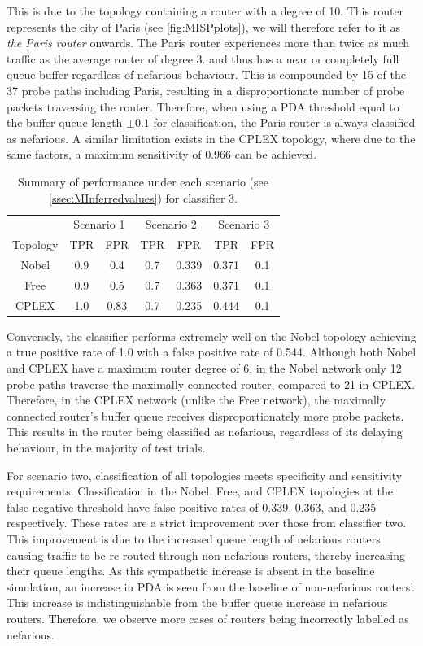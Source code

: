This is due to the topology containing a router with a degree of 10. This router represents the city of Paris (see \cref{fig:MISPplots}), we will therefore refer to it as \textit{the Paris router} onwards. The Paris router experiences more than twice as much traffic as the average router of degree 3. and thus has a near or completely full queue buffer regardless of nefarious behaviour. This is compounded by 15 of the 37 probe paths including Paris, resulting in a disproportionate number of probe packets traversing the router. Therefore, when using a PDA threshold equal to the buffer queue length $\pm0.1$ for classification, the Paris router is always classified as nefarious. A similar limitation exists in the CPLEX topology, where due to the same factors, a maximum sensitivity of 0.966 can be achieved.\par
\begin{table}[t]
    \centering
    \begin{tabular}{ccccccc}
        & \multicolumn{2}{c}{Scenario 1} & \multicolumn{2}{c}{Scenario 2} & \multicolumn{2}{c}{Scenario 3}\\
        \cmidrule(lr){2-3} \cmidrule(lr){4-5} \cmidrule(lr){6-7}
        Topology & TPR & FPR & TPR & FPR & TPR & FPR\\
        \midrule
        Nobel & 0.9 & 0.4  & 0.7 & 0.339 & 0.371 & 0.1 \\
        Free  & 0.9 & 0.5  & 0.7 & 0.363 & 0.371 & 0.1 \\
        CPLEX & 1.0 & 0.83 & 0.7 & 0.235 & 0.444 & 0.1 \\
    \end{tabular}
    \caption{Summary of performance under each scenario (see \cref{ssec:MInferredvalues}) for classifier 3.}
    \label{tbl:Rassumptionset3summary}
\end{table}
Conversely, the classifier performs extremely well on the Nobel topology achieving a true positive rate of 1.0 with a false positive rate of 0.544. Although both Nobel and CPLEX have a maximum router degree of 6, in the Nobel network only 12 probe paths traverse the maximally connected router, compared to 21 in CPLEX. Therefore, in the CPLEX network (unlike the Free network), the maximally connected router's buffer queue receives disproportionately more probe packets. This results in the router being classified as nefarious, regardless of its delaying behaviour, in the majority of test trials.\par
For scenario two, classification of all topologies meets specificity and sensitivity requirements. Classification in the Nobel, Free, and CPLEX topologies at the false negative threshold have false positive rates of 0.339, 0.363, and 0.235 respectively. These rates are a strict improvement over those from classifier two. This improvement is due to the increased queue length of nefarious routers causing traffic to be re-routed through non-nefarious routers, thereby increasing their queue lengths. As this sympathetic increase is absent in the baseline simulation, an increase in PDA is seen from the baseline of non-nefarious routers’. This increase is indistinguishable from the buffer queue increase in nefarious routers. Therefore, we observe more cases of routers being incorrectly labelled as nefarious.\par
